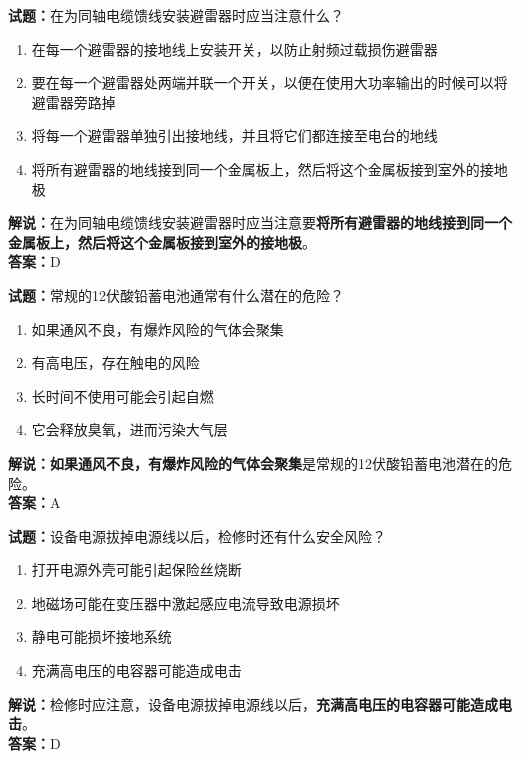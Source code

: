 \documentclass{ctexbook}
\begin{document}
\noindent\textbf{试题：}在为同轴电缆馈线安装避雷器时应当注意什么？
\begin{enumerate}[leftmargin=3em]
  \item 在每一个避雷器的接地线上安装开关，以防止射频过载损伤避雷器
  \item 要在每一个避雷器处两端并联一个开关，以便在使用大功率输出的时候可以将避雷器旁路掉
  \item 将每一个避雷器单独引出接地线，并且将它们都连接至电台的地线
  \item 将所有避雷器的地线接到同一个金属板上，然后将这个金属板接到室外的接地极
\end{enumerate}
\noindent\textbf{解说：}在为同轴电缆馈线安装避雷器时应当注意要\textbf{将所有避雷器的地线接到同一个金属板上，然后将这个金属板接到室外的接地极}。\\\noindent\textbf{答案：}D

\vspace{\baselineskip}

\noindent\textbf{试题：}常规的12伏酸铅蓄电池通常有什么潜在的危险？
\begin{enumerate}[leftmargin=3em]
  \item 如果通风不良，有爆炸风险的气体会聚集
  \item 有高电压，存在触电的风险
  \item 长时间不使用可能会引起自燃
  \item 它会释放臭氧，进而污染大气层
\end{enumerate}
\noindent\textbf{解说：}\textbf{如果通风不良，有爆炸风险的气体会聚集}是常规的12伏酸铅蓄电池潜在的危险。\\\noindent\textbf{答案：}A

\vspace{\baselineskip}

\noindent\textbf{试题：}设备电源拔掉电源线以后，检修时还有什么安全风险？
\begin{enumerate}[leftmargin=3em]
  \item 打开电源外壳可能引起保险丝烧断
  \item 地磁场可能在变压器中激起感应电流导致电源损坏
  \item 静电可能损坏接地系统
  \item 充满高电压的电容器可能造成电击
\end{enumerate}
\noindent\textbf{解说：}检修时应注意，设备电源拔掉电源线以后，\textbf{充满高电压的电容器可能造成电击}。\\\noindent\textbf{答案：}D

\vspace{\baselineskip}
\end{document}

